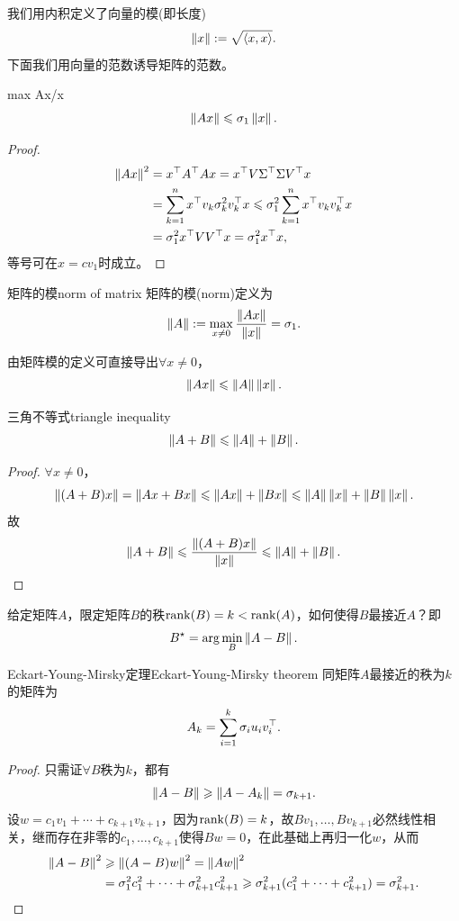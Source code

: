 我们用内积定义了向量的模(即长度)
\[
	\left\lVert x\right\rVert:=\sqrt{\left\langle x,x\right\rangle}.
\]
下面我们用向量的范数诱导矩阵的范数。
\begin{theorem}{}{max Ax/x}
	\begin{equation}
		\left\lVert Ax\right\rVert\leqslant\sigma_1\left\lVert x\right\rVert.
	\end{equation}
\end{theorem}
\begin{proof}
	
	\begin{align*}
		\left\lVert Ax\right\rVert^2&=x^\top A^\top Ax=x^\top V\Sigma^\top\Sigma V^\top x\\
		&=\sum_{k=1}^nx^\top v_k\sigma_k^2v_k^\top x\leqslant\sigma_1^2\sum_{k=1}^nx^\top v_kv_k^\top x\\
		&=\sigma_1^2x^\top VV^\top x=\sigma_1^2x^\top x,
	\end{align*}
	等号可在$x=cv_1$时成立。
\end{proof}
\begin{definition}{矩阵的模}{norm of matrix}
	矩阵的模(norm)定义为 
	\begin{equation}
		\left\lVert A\right\rVert:=\max_{x\neq 0}\frac{\left\lVert Ax\right\rVert}{\left\lVert x\right\rVert}=\sigma_1.
	\end{equation}
\end{definition}
\begin{corollary}
	由矩阵模的定义可直接导出$\forall x\neq 0$，
	\[
		\left\lVert Ax\right\rVert\leqslant\left\lVert A\right\rVert\left\lVert x\right\rVert.
	\]
\end{corollary}
\begin{theorem}{三角不等式}{triangle inequality}
	\begin{equation}
		\left\lVert A+B\right\rVert\leqslant\left\lVert A\right\rVert+\left\lVert B\right\rVert.
	\end{equation}
\end{theorem}
\begin{proof}
	$\forall x\neq 0$，
	\[
		\left\lVert(A+B)x\right\rVert=\left\lVert Ax+Bx\right\rVert\leqslant\left\lVert Ax\right\rVert+\left\lVert Bx\right\rVert\leqslant\left\lVert A\right\rVert\left\lVert x\right\rVert+\left\lVert B\right\rVert\left\lVert x\right\rVert.
	\]
	故
	\[
		\left\lVert A+B\right\rVert\leqslant\frac{\left\lVert(A+B)x\right\rVert}{\left\lVert x\right\rVert}\leqslant\left\lVert A\right\rVert+\left\lVert B\right\rVert.
	\]
\end{proof}

给定矩阵$A$，限定矩阵$B$的秩$\operatorname{rank}(B)=k<\operatorname{rank}(A)$，如何使得$B$最接近$A$？即
\[
	B^\star=\arg\min_B\left\lVert A-B\right\rVert.
\]

\begin{theorem}{Eckart-Young-Mirsky定理}{Eckart-Young-Mirsky theorem}
	同矩阵$A$最接近的秩为$k$的矩阵为
	\begin{equation}
		A_k=\sum_{i=1}^k\sigma_iu_iv_i^\top.
	\end{equation}
\end{theorem}
\begin{proof}
	只需证$\forall B$秩为$k$，都有
	\[
		\left\lVert A-B\right\rVert\geqslant\left\lVert A-A_k\right\rVert=\sigma_{k+1}.
	\]
	设$w=c_1v_1+\cdots+c_{k+1}v_{k+1}$，因为$\operatorname{rank}(B)=k$，故$Bv_1,\ldots,Bv_{k+1}$必然线性相关，继而存在非零的$c_1,\ldots,c_{k+1}$使得$Bw=0$，在此基础上再归一化$w$，从而
	\begin{align*}
		\left\lVert A-B\right\rVert^2&\geqslant\left\lVert(A-B)w\right\rVert^2=\left\lVert Aw\right\rVert^2\\
		&=\sigma_1^2c_1^2+\cdots+\sigma_{k+1}^2c_{k+1}^2\geqslant\sigma_{k+1}^2(c_1^2+\cdots+c_{k+1}^2)=\sigma_{k+1}^2.
		\qedhere
	\end{align*}
\end{proof}

